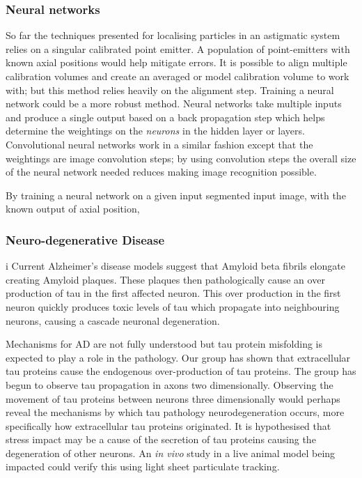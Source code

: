 \subsubsection{Neural networks} %

So far the techniques presented for localising particles in an astigmatic system relies on a singular calibrated point emitter.
A population of point-emitters with known axial positions would help mitigate errors.
It is possible to align multiple calibration volumes and create an averaged or model calibration volume to work with; but this method relies heavily on the alignment step.
Training a neural network could be a more robust method.
Neural networks take multiple inputs and produce a single output based on a back propagation step which helps determine the weightings on the \emph{neurons} in the hidden layer or layers.
Convolutional neural networks work in a similar fashion except that the weightings are image convolution steps; by using convolution steps the overall size of the neural network needed reduces making image recognition possible.

By training a neural network on a given input segmented input image, with the known output of axial position,

\subsubsection{Neuro-degenerative Disease}

i
Current Alzheimer's disease models suggest that Amyloid beta fibrils elongate creating Amyloid plaques.
These plaques then pathologically cause an over production of tau in the first affected neuron.
This over production in the first neuron quickly produces toxic levels of tau which propagate into neighbouring neurons, causing a cascade neuronal degeneration\cite{King2002}.

Mechanisms for AD are not fully understood but tau protein misfolding is expected to play a role in the pathology\cite{LaFerla2008}.
Our group has shown that extracellular tau proteins cause the endogenous over-production of tau proteins\cite{Michel2014a}.
The group has begun to observe tau propagation in axons two dimensionally.
Observing the movement of tau proteins between neurons three dimensionally would perhaps reveal the mechanisms by which tau pathology neurodegeneration occurs, more specifically how extracellular tau proteins originated.
It is hypothesised that stress impact may be a cause of the secretion of tau proteins causing the degeneration of other neurons\cite{Gavett2011,Patterson2014a}.
An \textit{in vivo} study in a live animal model being impacted could verify this using light sheet particulate tracking.

